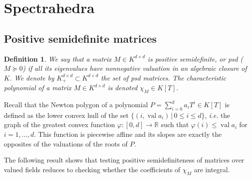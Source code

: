 \documentclass[sigconf]{acmart}
\newcommand{\R}{\mathbb{R}} %
\newtheorem{definition}[theorem]{Definition}
\DeclareMathOperator{\val}{val}
\begin{document}
\section{Spectrahedra}
\label{sec:spectrahedra}
  
\subsection{Positive semidefinite matrices}
\newcommand\Mat{Positive semidefinite matrix }
\newcommand\mats{positive semidefinite matrices }
\newcommand\Mats{positive semidefinite matrices }

\begin{definition}
  We say that a matrix $M \in K^{d \times d}$ is {positive semidefinite, or psd} ($M \succeq 0$)
  if all its eigenvalues have nonnegative valuation in an algebraic closure of $K$.
  We denote by $K^{d \times d}_+ \subset K^{d\times d}$ the set of psd matrices.
  The characteristic polynomial of a matrix $M \in K^{d\times d}$ is denoted $\chi_M \in K[T]$.
\end{definition}

Recall that the {Newton polygon} of a polynomial $P = \sum_{i=0}^{d} a_i T^i \in K[T]$ is
defined as the lower convex hull of the set $\{(i, \val a_i) \,|\, 0 \le i \le d\}$, {\it i.e.} the
graph of the greatest convex function $\varphi : [0,d] \to \R$ such that $\varphi(i) \leq \val a_i$
for $i=1,\ldots,d$. This function is piecewise affine and its slopes are exactly the opposites of the valuations
of the roots of $P$.

The following result shows that testing positive semidefiniteness of matrices over
valued fields reduces to checking whether the coefficients of $\chi_M$ are integral.
\end{document}
